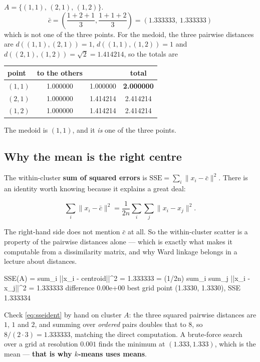 \documentclass[11pt]{article}
\begin{document}
\begin{worked}
$A = \{(1,1),\,(2,1),\,(1,2)\}$.
\[
  \bar{c} = \left(\frac{1+2+1}{3}, \frac{1+1+2}{3}\right)
  = (1.333333,\ 1.333333)
\]
which is not one of the three points. For the medoid, the three pairwise
distances are $d((1,1),(2,1)) = 1$, $d((1,1),(1,2)) = 1$ and
$d((2,1),(1,2)) = \sqrt{2} = 1.414214$, so the totals are
\begin{center}
\begin{tabular}{lccc}
  \toprule
  point & to the others & & total \\ \midrule
  $(1,1)$ & 1.000000 & 1.000000 & \textbf{2.000000} \\
  $(2,1)$ & 1.000000 & 1.414214 & 2.414214 \\
  $(1,2)$ & 1.000000 & 1.414214 & 2.414214 \\ \bottomrule
\end{tabular}
\end{center}
The medoid is $(1,1)$, and it \emph{is} one of the three points.
\end{worked}

\subsection{Why the mean is the right centre}

The within-cluster \textbf{sum of squared errors} is
$\mathrm{SSE} = \sum_i \|x_i - \bar{c}\|^2$. There is an identity worth
knowing because it explains a great deal:

\begin{equation}
  \sum_{i} \|x_i - \bar{c}\|^2
  = \frac{1}{2n}\sum_{i}\sum_{j} \|x_i - x_j\|^2.
  \label{eq:sseident}
\end{equation}

The right-hand side does not mention $\bar{c}$ at all. So the within-cluster
scatter is a property of the pairwise distances alone --- which is exactly
what makes it computable from a dissimilarity matrix, and why Ward linkage
belongs in a lecture about distances.

\begin{codeout}
SSE(A) = sum_i ||x_i - centroid||^2          = 1.333333
       = (1/2n) sum_i sum_j ||x_i - x_j||^2  = 1.333333
difference 0.00e+00
  best grid point (1.3330, 1.3330), SSE 1.333334
\end{codeout}

Check \eqref{eq:sseident} by hand on cluster $A$: the three squared pairwise
distances are $1$, $1$ and $2$, and summing over \emph{ordered} pairs doubles
that to $8$, so $8/(2\cdot3) = 1.333333$, matching the direct computation. A
brute-force search over a grid at resolution $0.001$ finds the minimum at
$(1.333, 1.333)$, which is the mean --- \textbf{that is why $k$-means uses
means}.
\end{document}
